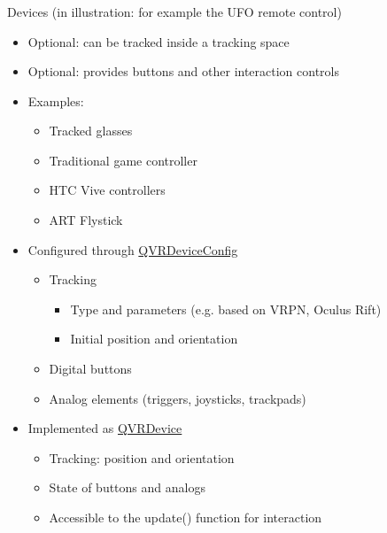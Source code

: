 \documentclass[utf8,stillsansserifmath,fleqn,t]{beamer}
\begin{document}
\begin{frame}
\frametitle{\insertsection}
Devices (in illustration: for example the UFO remote control)
\begin{itemize}
\item Optional: can be tracked inside a tracking space
\item Optional: provides buttons and other interaction controls
\item Examples:
    \begin{itemize}
    \item Tracked glasses
    \item Traditional game controller
    \item HTC Vive controllers
    \item ART Flystick
    \end{itemize}
\item Configured through \href{https://marlam.de/qvr/libqvr-reference/class_q_v_r_device_config.html}{QVRDeviceConfig}
    \begin{itemize}
    \item Tracking
        \begin{itemize}
        \item Type and parameters (e.g. based on VRPN, Oculus Rift)
        \item Initial position and orientation
        \end{itemize}
    \item Digital buttons
    \item Analog elements (triggers, joysticks, trackpads)
    \end{itemize}
\item Implemented as \href{https://marlam.de/qvr/libqvr-reference/class_q_v_r_device.html}{QVRDevice}
    \begin{itemize}
    \item Tracking: position and orientation
    \item State of buttons and analogs
    \item Accessible to the update() function for interaction
    \end{itemize}
\end{itemize}
\end{frame}
\end{document}
